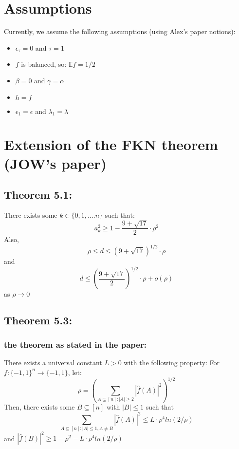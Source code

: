 \documentclass{article}
\author{Mahmoud Agbareya}
\date{5-Oct-2016}
\begin{document}
	\section{Assumptions}
		Currently, we assume the following assumptions (using Alex's paper notions):
		\begin{itemize}
			\item $ \epsilon_\tau = 0 $ and $ \tau = 1 $
			\item $f$ is balanced, so: $ \mathbb{E} f = 1/2 $
			\item $ \beta = 0 $ and $ \gamma = \alpha $
			\item $ h = f $
			\item $\epsilon_1 = \epsilon$ and $\lambda_1 = \lambda $
		\end{itemize}
	\section{Extension of the FKN theorem (JOW's paper)}
		\subsection{Theorem 5.1:}
			There exists some $ k \in \{0,1, \dots . n\} $ such that:
			$$ a_k^2 \geq 1 - \frac{9 + \sqrt{17}}{2} \cdot \rho^2 $$
			Also,
			\begin{equation} \label{thm5:1}
				\rho \leq d \leq \left( 9 + \sqrt{17} \right) ^ {1/2} \cdot \rho
			\end{equation}
			and
			\begin{equation} \label{thm5:2}
				d \leq \left( \frac{9 + \sqrt{17}}{2}  \right) ^ {1/2} \cdot \rho + o(\rho)
			\end{equation}
			as $ \rho \rightarrow 0 $
	
		\subsection{Theorem 5.3:}
			\subsubsection{the theorem as stated in the paper:}
				There exists a universal constant $L > 0$ with the following property: For $ f : \{-1,1\}^n \rightarrow \{-1,1\}$, let:
				$$ \rho = \left( \sum_{A \subseteq [n]: |A| \geq 2} |\hat{f}(A)|^2 \right) ^ {1/2} $$
				Then, there exists some $ B \subseteq [n] $ with $|B| \leq 1 $ such that
				$$ \sum_{A \subseteq [n]: |A| \leq 1, A \neq B} |\hat{f}(A)|^2 \leq L \cdot \rho^4 ln(2/\rho)$$
				and $ |\hat{f}(B)|^2 \geq 1 - \rho^2 - L \cdot \rho^4 ln(2/\rho) $
\end{document}
